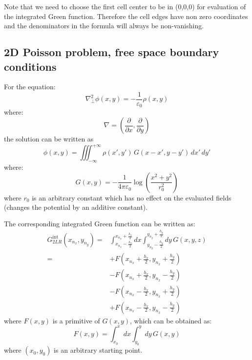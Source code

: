 Note that we need to choose the first cell center to be in (0,0,0) for evaluation of the integrated Green function. Therefore the cell edges have non zero coordinates and the denominators in the formula will always be non-vanishing.

\subsection*{2D Poisson problem, free space boundary conditions}

For the equation:
\begin{equation}
\nabla_\perp^2 \phi(x,y) = -\frac{1}{\varepsilon_0} \rho(x,y)
\end{equation}
where:
\begin{equation}
\nabla = \left(\frac{\partial}{\partial x}, 
                      \frac{\partial}{\partial y} \right)
\end{equation}
the solution can be written as 
\begin{equation}
\phi(x, y) = \iiint_{-\infty}^{+\infty} \rho(x', y')
   \,G(x-x', y-y')\,dx'\,dy'
\end{equation}
where:
\begin{equation}
G(x, y) = -\frac{1}{4\pi\varepsilon_0} \log\left( \frac{x^2 + y^2}{r_0^2}\right)
\end{equation}
where $r_0$ is an arbitrary constant which has no effect on the evaluated fields (changes the potential by an additive constant). 

The corresponding integrated Green function can be written as:
\begin{align}
G_{2LR}^\text{int}(x_{n_x}, y_{n_y}) =& 
\int_{x_{n_x}-\frac{h_x}{2}}^{x_{n_x}+\frac{h_x}{2}} dx
\int_{y_{n_y}-\frac{h_y}{2}}^{y_{n_y}+\frac{h_y}{2}} dy\,
G(x,y,z)\\
= &+F\left(x_{n_x}+\frac{h_x}{2}, y_{n_x}+\frac{h_y}{2}\right)\\
    &-F\left(x_{n_x}+\frac{h_x}{2}, y_{n_x}-\frac{h_y}{2}\right)\\
    &-F\left(x_{n_x}-\frac{h_x}{2}, y_{n_x}+\frac{h_y}{2}\right)\\ 
    &+F\left(x_{n_x}-\frac{h_x}{2}, y_{n_x}-\frac{h_y}{2}\right)
\end{align}
where $F(x,y)$ is a primitive of $G(x,y)$, which can be obtained as:
\begin{equation}
F(x,y) = 
\int_{x_0}^{x} dx
\int_{y_0}^{y} dy\,
G(x,y)
\end{equation}
where $(x_0, y_0)$ is an arbitrary starting point.

